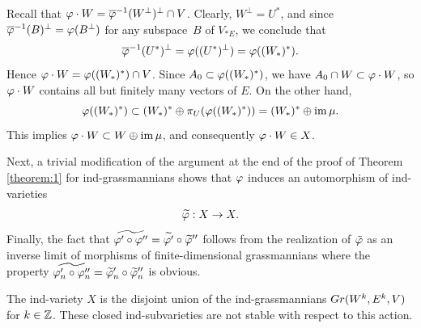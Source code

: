 \documentclass[11pt, a4paper]{article}
\begin{document}
{Recall that $\varphi\cdot W=\overline{\varphi}^{-1}(W^{\perp})^{\perp}\cap V$. Clearly, $W^{\perp}=U^*$, and since $\overline{\varphi}^{-1}(B)^{\perp}=\varphi(B^{\perp})$ for any subspace~$B$ of $V_{*E}$, we conclude that $$\overline{\varphi}^{-1}(U^*)^{\perp}=\varphi((U^*)^\perp)=\varphi((W_*)^*).$$ Hence $\varphi\cdot W=\varphi((W_*)^*)\cap V$. Since $A_0\subset\varphi((W_*)^*)$, we have $A_0\cap W\subset\varphi\cdot W$, so $\varphi\cdot W$ contains all but finitely many vectors of $E$. On the other hand, $$\varphi((W_*)^*)\subset (W_*)^*\oplus\pi_U(\varphi((W_*)^*))=(W_*)^*\oplus\mathrm{im}\,\mu.$$ This implies $\varphi\cdot W\subset W\oplus\mathrm{im}\,\mu$, %
and consequently $\varphi\cdot W\in X$.

Next, a trivial modification of the argument at the end of the proof of Theorem \ref{theorem:1} for ind-grassmannians shows that $\varphi$ induces an automorphism of ind-varieties\begin{equation*}
\widetilde{\varphi}:X\rightarrow X.
\end{equation*}
Finally, the fact that $\widetilde{\varphi'\circ \varphi''}=\widetilde{\varphi'}\circ \widetilde{\varphi}''$ follows from the realization of $\tilde{\varphi}$ as an inverse limit of morphisms of finite-dimensional grassmannians where the property $\widetilde{\varphi_n'\circ \varphi_n''}=\widetilde{\varphi}_n'\circ \widetilde{\varphi}_n''$ is obvious.
}


The ind-variety $X$ is the disjoint union of the ind-grassmannians $Gr(W^k,E^k,V)$ for $k\in\mathbb{Z}$. These closed ind-subvarieties are not stable with respect to this action. 
\end{document}
